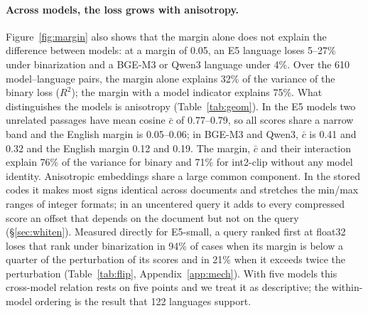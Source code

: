 \documentclass[11pt]{article}
\begin{document}
\paragraph{Across models, the loss grows with anisotropy.} Figure~\ref{fig:margin} also shows that the margin alone does not explain the difference between models: at a margin of 0.05, an E5 language loses 5--27\% under binarization and a BGE-M3 or Qwen3 language under 4\%. Over the 610 model--language pairs, the margin alone explains 32\% of the variance of the binary loss ($R^2$); the margin with a model indicator explains 75\%. What distinguishes the models is anisotropy (Table~\ref{tab:geom}). In the E5 models two unrelated passages have mean cosine $\bar c$ of 0.77--0.79, so all scores share a narrow band and the English margin is 0.05--0.06; in BGE-M3 and Qwen3, $\bar c$ is 0.41 and 0.32 and the English margin 0.12 and 0.19. The margin, $\bar c$ and their interaction explain 76\% of the variance for binary and 71\% for int2-clip without any model identity. Anisotropic embeddings share a large common component. In the stored codes it makes most signs identical across documents and stretches the min/max ranges of integer formats; in an uncentered query it adds to every compressed score an offset that depends on the document but not on the query (\S\ref{sec:whiten}). Measured directly for E5-small, a query ranked first at float32 loses that rank under binarization in 94\% of cases when its margin is below a quarter of the perturbation of its scores and in 21\% when it exceeds twice the perturbation (Table~\ref{tab:flip}, Appendix~\ref{app:mech}). With five models this cross-model relation rests on five points and we treat it as descriptive; the within-model ordering is the result that 122 languages support.
\end{document}
